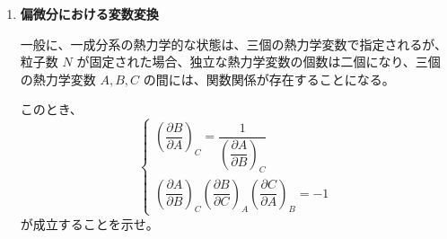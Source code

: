 \documentclass[uplatex,dvipdfmx,a4paper,11pt]{jsarticle}
\begin{document}
\begin{enumerate}
\item 
{\bf 偏微分における変数変換}

一般に、一成分系の熱力学的な状態は、三個の熱力学変数で指定されるが、粒子数 $N$ が固定された場合、独立な熱力学変数の個数は二個になり、三個の熱力学変数 $A, B, C$ の間には、関数関係が存在することになる。

このとき、
\begin{equation*}
\begin{cases}
\left(\dfrac{\partial B}{\partial A} \right)_{C} = \dfrac{1}{ \left( \dfrac{\partial A}{\partial B} \right)_{C} } \\[12pt]
\left(\dfrac{\partial A}{\partial B} \right)_{C} \left(\dfrac{\partial B}{\partial C} \right)_{A} \left(\dfrac{\partial C}{\partial A} \right)_{B} = -1
\end{cases}
\end{equation*}
が成立することを示せ。


\end{enumerate}
\end{document}
